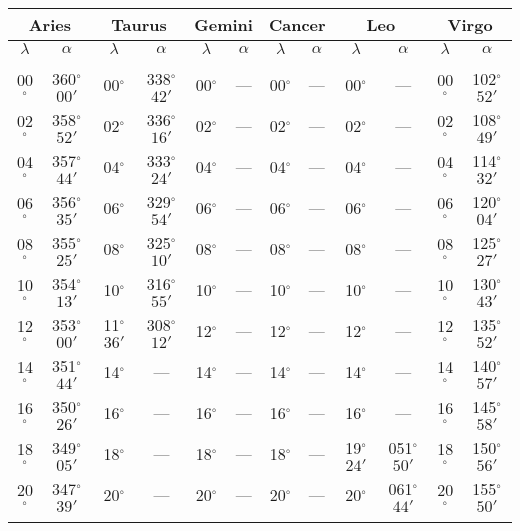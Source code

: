 \begin{table}
\centering
{\small \begin{tabular}{cc|cc|cc|cc|cc|cc}
\multicolumn{2}{c}{Aries}\vline & \multicolumn{2}{c}{Taurus} \vline& \multicolumn{2}{c}{Gemini} \vline& \multicolumn{2}{c}{Cancer}\vline &
\multicolumn{2}{c}{Leo}\vline & \multicolumn{2}{c}{Virgo}\\\hline
$\lambda$& $\alpha$& $\lambda$& $\alpha$& $\lambda$& $\alpha$& $\lambda$& $\alpha$& $\lambda$& $\alpha$& $\lambda$& $\alpha$\\\hline
&&&&&&&&&&&\\[-2ex]
00$^\circ$ & 360$^\circ$$00'$ & 00$^\circ$ & 338$^\circ$$42'$ & 00$^\circ$ & --- & 00$^\circ$ & --- & 00$^\circ$ & --- & 00$^\circ$ & 102$^\circ$$52'$\\
02$^\circ$ & 358$^\circ$$52'$ & 02$^\circ$ & 336$^\circ$$16'$ & 02$^\circ$ & --- & 02$^\circ$ & --- & 02$^\circ$ & --- & 02$^\circ$ & 108$^\circ$$49'$\\
04$^\circ$ & 357$^\circ$$44'$ & 04$^\circ$ & 333$^\circ$$24'$ & 04$^\circ$ & --- & 04$^\circ$ & --- & 04$^\circ$ & --- & 04$^\circ$ & 114$^\circ$$32'$\\
06$^\circ$ & 356$^\circ$$35'$ & 06$^\circ$ & 329$^\circ$$54'$ & 06$^\circ$ & --- & 06$^\circ$ & --- & 06$^\circ$ & --- & 06$^\circ$ & 120$^\circ$$04'$\\
08$^\circ$ & 355$^\circ$$25'$ & 08$^\circ$ & 325$^\circ$$10'$ & 08$^\circ$ & --- & 08$^\circ$ & --- & 08$^\circ$ & --- & 08$^\circ$ & 125$^\circ$$27'$\\
10$^\circ$ & 354$^\circ$$13'$ & 10$^\circ$ & 316$^\circ$$55'$ & 10$^\circ$ & --- & 10$^\circ$ & --- & 10$^\circ$ & --- & 10$^\circ$ & 130$^\circ$$43'$\\
12$^\circ$ & 353$^\circ$$00'$ & 11$^\circ$$36'$ &308$^\circ$$12'$  & 12$^\circ$ & --- & 12$^\circ$ & --- & 12$^\circ$ & --- & 12$^\circ$ & 135$^\circ$$52'$\\
14$^\circ$ & 351$^\circ$$44'$ & 14$^\circ$ & --- & 14$^\circ$ & --- & 14$^\circ$ & --- & 14$^\circ$ & --- & 14$^\circ$ & 140$^\circ$$57'$\\
16$^\circ$ & 350$^\circ$$26'$ & 16$^\circ$ & --- & 16$^\circ$ & --- & 16$^\circ$ & --- & 16$^\circ$ & --- & 16$^\circ$ & 145$^\circ$$58'$\\
18$^\circ$ & 349$^\circ$$05'$ & 18$^\circ$ & --- & 18$^\circ$ & --- & 18$^\circ$ & --- & 19$^\circ$$24'$ & 051$^\circ$$50'$& 18$^\circ$ & 150$^\circ$$56'$\\
20$^\circ$ & 347$^\circ$$39'$ & 20$^\circ$ & --- & 20$^\circ$ & --- & 20$^\circ$ & --- & 20$^\circ$ & 061$^\circ$$44'$ & 20$^\circ$ & 155$^\circ$$50'$\\
$$
\end{tabular}}
\end{table}
